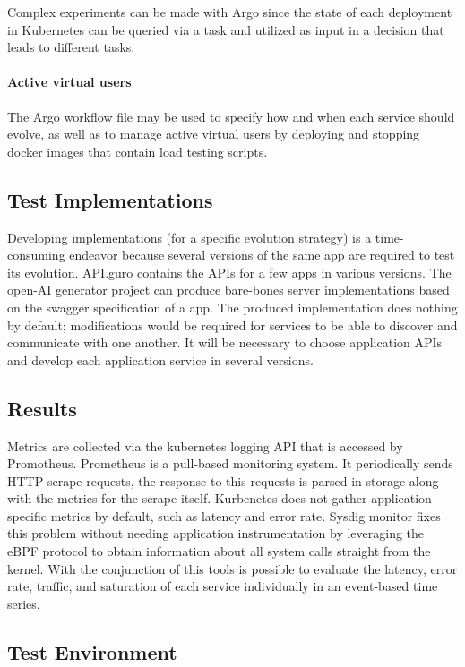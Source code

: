 Complex experiments can be made with Argo since the state of each deployment in Kubernetes can be queried via a task and utilized as input in a decision that leads to different tasks.

\paragraph{Active virtual users} The Argo workflow file may be used to specify how and when each service should evolve, as well as to manage active virtual users by deploying and stopping docker images that contain load testing scripts.

\subsection{Test Implementations} %
\label{sec:test_implementations}

Developing implementations (for a specific evolution strategy) is a time-consuming endeavor because several versions of the same app are required to test its evolution.
API.guro contains the APIs for a few apps in various versions.
The open-AI generator project can produce bare-bones server implementations based on the swagger specification of a app.
The produced implementation does nothing by default; modifications would be required for services to be able to discover and communicate with one another.
It will be necessary to choose application APIs and develop each application service in several versions.

\subsection{Results}

Metrics are collected via the kubernetes logging API that is accessed by Promotheus. Prometheus is a pull-based monitoring system. It periodically sends HTTP scrape requests, the response to this requests is parsed in storage along with the metrics for the scrape itself.
Kurbenetes does not gather application-specific metrics by default, such as latency and error rate. Sysdig monitor fixes this problem without needing application instrumentation by leveraging the eBPF protocol to obtain information about all system calls straight from the kernel.
With the conjunction of this tools is possible to evaluate the latency, error rate, traffic, and saturation of each service individually in an event-based time series.

\subsection{Test Environment}

